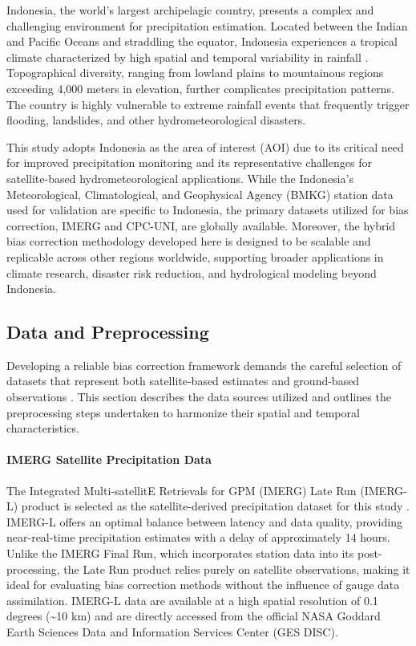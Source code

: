 \documentclass[11pt,a4paper]{article}
\begin{document}
Indonesia, the world's largest archipelagic country, presents a complex
and challenging environment for precipitation estimation. Located
between the Indian and Pacific Oceans and straddling the equator,
Indonesia experiences a tropical climate characterized by high spatial
and temporal variability in rainfall \cite{ref19,ref20}. Topographical
diversity, ranging from lowland plains to mountainous regions exceeding
4,000 meters in elevation, further complicates precipitation patterns.
The country is highly vulnerable to extreme rainfall events that
frequently trigger flooding, landslides, and other hydrometeorological
disasters.

This study adopts Indonesia as the area of interest (AOI) due to its
critical need for improved precipitation monitoring and its
representative challenges for satellite-based hydrometeorological
applications. While the Indonesia's Meteorological, Climatological, and
Geophysical Agency (BMKG) station data used for validation are specific
to Indonesia, the primary datasets utilized for bias correction, IMERG
and CPC-UNI, are globally available. Moreover, the hybrid bias
correction methodology developed here is designed to be scalable and
replicable across other regions worldwide, supporting broader
applications in climate research, disaster risk reduction, and
hydrological modeling beyond Indonesia.

\subsection{Data and Preprocessing}\label{data-and-preprocessing}

Developing a reliable bias correction framework demands the careful
selection of datasets that represent both satellite-based estimates and
ground-based observations \cite{ref22}. This section describes the data
sources utilized and outlines the preprocessing steps undertaken to
harmonize their spatial and temporal characteristics.

\paragraph{IMERG Satellite Precipitation
Data}\label{imerg-satellite-precipitation-data}

The Integrated Multi-satellitE Retrievals for GPM (IMERG) Late Run
(IMERG-L) product is selected as the satellite-derived precipitation
dataset for this study \cite{ref2,ref21}. IMERG-L offers an optimal balance
between latency and data quality, providing near-real-time precipitation
estimates with a delay of approximately 14 hours. Unlike the IMERG Final
Run, which incorporates station data into its post-processing, the Late
Run product relies purely on satellite observations, making it ideal for
evaluating bias correction methods without the influence of gauge data
assimilation. IMERG-L data are available at a high spatial resolution of
0.1 degrees (\textasciitilde10 km) and are directly accessed from the
official NASA Goddard Earth Sciences Data and Information Services
Center (GES DISC).
\end{document}
